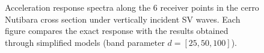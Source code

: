 \documentclass[11pt,letterpaper]{article}
\begin{document}
\begin{figure}[H]
	\center
	\caption{\small Acceleration response spectra along the 6 receiver points in the cerro Nutibara cross section under vertically incident SV waves. Each figure compares the exact response with the results obtained through simplified models (band parameter $d = [25 , 50 , 100]$). }
 \label{fig:SaptosNutEWSV}
\end{figure}
\end{document}
